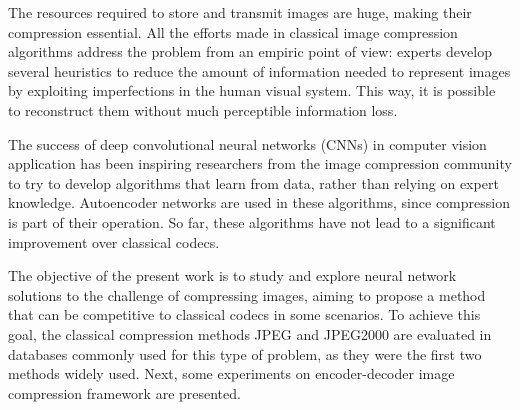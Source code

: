 The resources required to store and transmit images are huge, making their compression essential. All the efforts made in classical image compression algorithms address the problem from an empiric point of view: experts develop several heuristics to reduce the amount of information needed to represent images by exploiting imperfections in the human visual system. This way, it is possible to reconstruct them without much perceptible information loss.

The success of deep convolutional neural networks (CNNs) in computer vision application has been inspiring researchers from the image compression community to try to develop algorithms that learn from data, rather than relying on expert knowledge. Autoencoder networks are used in these algorithms, since compression is part of their operation. So far, these algorithms have not lead to a significant improvement over classical codecs.

The objective of the present work is to study and explore neural network solutions to the challenge of compressing images, aiming to propose a method that can be competitive to classical codecs in some scenarios. To achieve this goal, the classical compression methods JPEG and JPEG2000 are evaluated in databases commonly used for this type of problem, as they were the first two methods widely used. Next, some experiments on encoder-decoder image compression framework are presented.